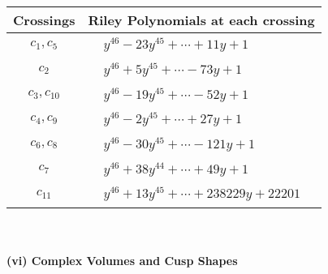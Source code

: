 \documentclass[1p]{elsarticle_modified}
\theoremstyle{definition}
\begin{document}
\begin{tabular}{m{50pt}|m{274pt}}
Crossings & \hspace{64pt}Riley Polynomials at each crossing \\
\hline $$\begin{aligned}c_{1},c_{5}\end{aligned}$$&$\begin{aligned}
&y^{46}-23 y^{45}+\cdots+11 y+1
\end{aligned}$\\
\hline $$\begin{aligned}c_{2}\end{aligned}$$&$\begin{aligned}
&y^{46}+5 y^{45}+\cdots-73 y+1
\end{aligned}$\\
\hline $$\begin{aligned}c_{3},c_{10}\end{aligned}$$&$\begin{aligned}
&y^{46}-19 y^{45}+\cdots-52 y+1
\end{aligned}$\\
\hline $$\begin{aligned}c_{4},c_{9}\end{aligned}$$&$\begin{aligned}
&y^{46}-2 y^{45}+\cdots+27 y+1
\end{aligned}$\\
\hline $$\begin{aligned}c_{6},c_{8}\end{aligned}$$&$\begin{aligned}
&y^{46}-30 y^{45}+\cdots-121 y+1
\end{aligned}$\\
\hline $$\begin{aligned}c_{7}\end{aligned}$$&$\begin{aligned}
&y^{46}+38 y^{44}+\cdots+49 y+1
\end{aligned}$\\
\hline $$\begin{aligned}c_{11}\end{aligned}$$&$\begin{aligned}
&y^{46}+13 y^{45}+\cdots+238229 y+22201
\end{aligned}$\\
\hline
\end{tabular}\\~\\
\newpage\flushleft \textbf{(vi) Complex Volumes and Cusp Shapes}
\end{document}
